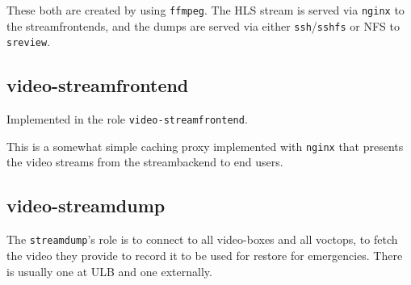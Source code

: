 \documentclass{article}
\begin{document}
These both are created by using \texttt{ffmpeg}. The HLS stream is served via \texttt{nginx} to the streamfrontends, and the dumps are served via either \texttt{ssh}/\texttt{sshfs} or NFS to \texttt{sreview}.

\subsection{video-streamfrontend}

Implemented in the role \texttt{video-streamfrontend}.

This is a somewhat simple caching proxy implemented with \texttt{nginx} that presents the video streams from the streambackend to end users.

\subsection{video-streamdump}

The \texttt{streamdump}'s role is to connect to all video-boxes and all voctops, to fetch the video they provide to record it to be used for restore for emergencies. There is usually one at ULB and one externally.
\end{document}
